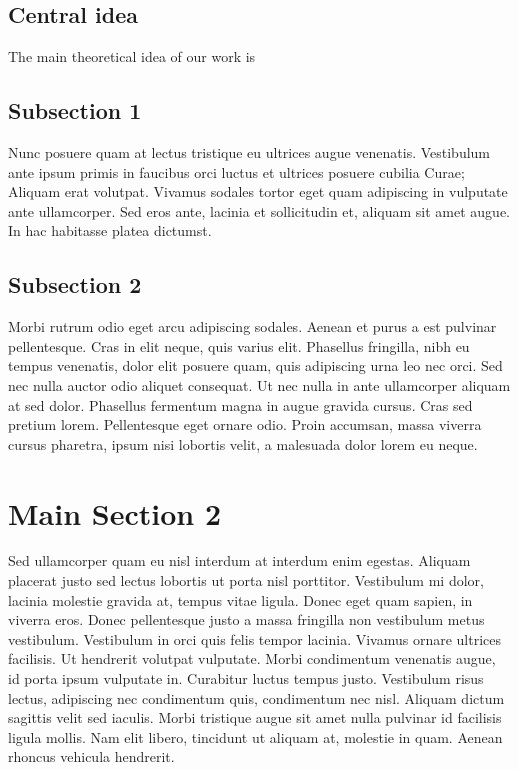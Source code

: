 \subsection{Central idea}
The main theoretical idea of our work is
\subsection{Subsection 1}

Nunc posuere quam at lectus tristique eu ultrices augue venenatis. Vestibulum ante ipsum primis in faucibus orci luctus et ultrices posuere cubilia Curae; Aliquam erat volutpat. Vivamus sodales tortor eget quam adipiscing in vulputate ante ullamcorper. Sed eros ante, lacinia et sollicitudin et, aliquam sit amet augue. In hac habitasse platea dictumst.


\subsection{Subsection 2}
Morbi rutrum odio eget arcu adipiscing sodales. Aenean et purus a est pulvinar pellentesque. Cras in elit neque, quis varius elit. Phasellus fringilla, nibh eu tempus venenatis, dolor elit posuere quam, quis adipiscing urna leo nec orci. Sed nec nulla auctor odio aliquet consequat. Ut nec nulla in ante ullamcorper aliquam at sed dolor. Phasellus fermentum magna in augue gravida cursus. Cras sed pretium lorem. Pellentesque eget ornare odio. Proin accumsan, massa viverra cursus pharetra, ipsum nisi lobortis velit, a malesuada dolor lorem eu neque.


\section{Main Section 2}

Sed ullamcorper quam eu nisl interdum at interdum enim egestas. Aliquam placerat justo sed lectus lobortis ut porta nisl porttitor. Vestibulum mi dolor, lacinia molestie gravida at, tempus vitae ligula. Donec eget quam sapien, in viverra eros. Donec pellentesque justo a massa fringilla non vestibulum metus vestibulum. Vestibulum in orci quis felis tempor lacinia. Vivamus ornare ultrices facilisis. Ut hendrerit volutpat vulputate. Morbi condimentum venenatis augue, id porta ipsum vulputate in. Curabitur luctus tempus justo. Vestibulum risus lectus, adipiscing nec condimentum quis, condimentum nec nisl. Aliquam dictum sagittis velit sed iaculis. Morbi tristique augue sit amet nulla pulvinar id facilisis ligula mollis. Nam elit libero, tincidunt ut aliquam at, molestie in quam. Aenean rhoncus vehicula hendrerit.